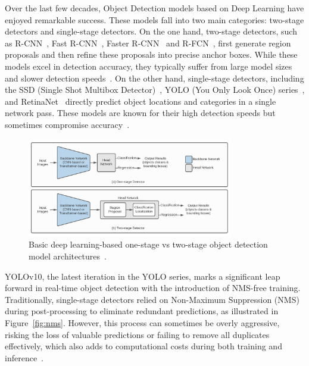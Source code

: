 \documentclass[12pt,oneside]{book} %
\begin{document}
Over the last few decades, Object Detection models based on Deep Learning have
enjoyed remarkable success. These models fall into two main categories:
two-stage detectors and single-stage detectors. On the one hand, two-stage
detectors, such as R-CNN~\cite{DBLP:journals/corr/GirshickDDM13}, Fast
R-CNN~\cite{DBLP:journals/corr/Girshick15}, Faster R-CNN~\cite{Ren2017} and
R-FCN~\cite{DBLP:journals/corr/DaiLHS16}, first generate region proposals and
then refine these proposals into precise anchor boxes. While these models excel
in detection accuracy, they typically suffer from large model sizes and slower
detection speeds~\cite{SurveyDLOD, ODNetworkUAVCNNTransformer}. On the other
hand, single-stage detectors, including the SSD (Single Shot Multibox
Detector)~\cite{DBLP:journals/corr/LiuAESR15}, YOLO (You Only Look Once)
series~\cite{DBLP:journals/corr/RedmonDGF15, DBLP:journals/corr/RedmonF16,
    DBLP:journals/corr/abs-2004-10934, chen2023yoloms,
    DBLP:journals/corr/abs-2107-08430, YOLOv5Release, li2023yolov6, YOLOv8,
    wang2024yolov9, xu2022ppyoloe, wang2023goldyolo, xu2023damoyolo,
    wang2024yolov10}, and RetinaNet~\cite{lin2018focal} directly predict object
locations and categories in a single network pass. These models are known for
their high detection speeds but sometimes compromise accuracy~\cite{SurveyDLOD,
    ODNetworkUAVCNNTransformer}.

\begin{figure}[H]
    \centering
    \includegraphics[width=0.8\textwidth]{figures/one-stage_two-stage_OD.png}
    \caption{Basic deep learning-based one-stage vs two-stage object detection model architectures~\cite{SurveyDLOD}.}\label{fig:two-stage-vs-single-stage}
\end{figure}

\newpage
YOLOv10, the latest iteration in the YOLO series, marks a significant leap
forward in real-time object detection with the introduction of NMS-free
training. Traditionally, single-stage detectors relied on Non-Maximum
Suppression (NMS) during post-processing to eliminate redundant predictions, as
illustrated in Figure~\ref{fig:nms}. However, this process can sometimes be
overly aggressive, risking the loss of valuable predictions or failing to
remove all duplicates effectively, which also adds to computational costs
during both training and inference~\cite{LearnOpenCVYOLOv10}.
\end{document}
